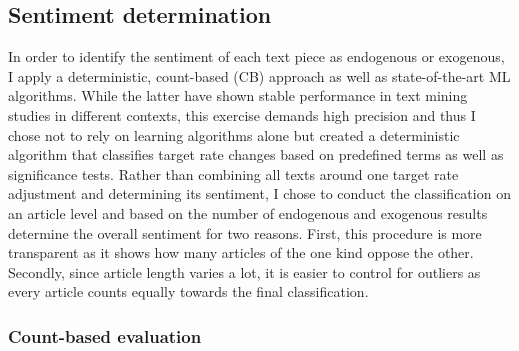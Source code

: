 

%
\subsection{Sentiment determination}

In order to identify the sentiment of each text piece as endogenous or exogenous, I apply a deterministic, count-based (CB) approach as well as state-of-the-art ML algorithms. While the latter have shown stable performance in text mining studies in different contexts, this exercise demands high precision and thus I chose not to rely on learning algorithms alone but created a deterministic algorithm that classifies target rate changes based on predefined terms as well as significance tests. Rather than combining all texts around one target rate adjustment and determining its sentiment, I chose to conduct the classification on an article level and based on the number of endogenous and exogenous results determine the overall sentiment for two reasons. First, this procedure is more transparent as it shows how many articles of the one kind oppose the other. Secondly, since article length varies a lot, it is easier to control for outliers as every article counts equally towards the final classification. 

%
\subsubsection{Count-based evaluation}

